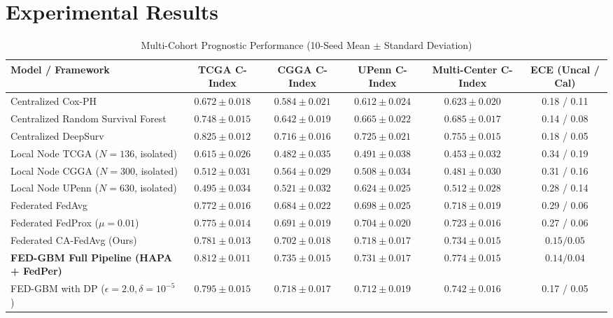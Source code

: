 \documentclass[journal,10pt,twocolumn]{IEEEtran}
\begin{document}
\section{Experimental Results}

\begin{table}[t]
\caption{Multi-Cohort Prognostic Performance (10-Seed Mean $\pm$ Standard Deviation)}
\label{tab:main_results}
\centering
\begin{tabular}{lccccc}
\toprule
Model / Framework & TCGA C-Index & CGGA C-Index & UPenn C-Index & Multi-Center C-Index & ECE (Uncal / Cal) \\
\midrule
Centralized Cox-PH & $0.672 \pm 0.018$ & $0.584 \pm 0.021$ & $0.612 \pm 0.024$ & $0.623 \pm 0.020$ & 0.18 / 0.11 \\
Centralized Random Survival Forest & $0.748 \pm 0.015$ & $0.642 \pm 0.019$ & $0.665 \pm 0.022$ & $0.685 \pm 0.017$ & 0.14 / 0.08 \\
Centralized DeepSurv & $\mathbf{0.825 \pm 0.012}$ & $\mathbf{0.716 \pm 0.016}$ & $\mathbf{0.725 \pm 0.021}$ & $\mathbf{0.755 \pm 0.015}$ & 0.18 / 0.05 \\
\midrule
Local Node TCGA ($N=136$, isolated) & $0.615 \pm 0.026$ & $0.482 \pm 0.035$ & $0.491 \pm 0.038$ & $0.453 \pm 0.032$ & 0.34 / 0.19 \\
Local Node CGGA ($N=300$, isolated) & $0.512 \pm 0.031$ & $0.564 \pm 0.029$ & $0.508 \pm 0.034$ & $0.481 \pm 0.030$ & 0.31 / 0.16 \\
Local Node UPenn ($N=630$, isolated) & $0.495 \pm 0.034$ & $0.521 \pm 0.032$ & $0.624 \pm 0.025$ & $0.512 \pm 0.028$ & 0.28 / 0.14 \\
\midrule
Federated FedAvg & $0.772 \pm 0.016$ & $0.684 \pm 0.022$ & $0.698 \pm 0.025$ & $0.718 \pm 0.019$ & 0.29 / 0.06 \\
Federated FedProx ($\mu = 0.01$) & $0.775 \pm 0.014$ & $0.691 \pm 0.019$ & $0.704 \pm 0.020$ & $0.723 \pm 0.016$ & 0.27 / 0.06 \\
Federated CA-FedAvg (Ours) & $0.781 \pm 0.013$ & $0.702 \pm 0.018$ & $0.718 \pm 0.017$ & $0.734 \pm 0.015$ & $\mathbf{0.15 / 0.05}$ \\
\textbf{FED-GBM Full Pipeline (HAPA + FedPer)} & $\mathbf{0.812 \pm 0.011}$ & $\mathbf{0.735 \pm 0.015}$ & $\mathbf{0.731 \pm 0.017}$ & $\mathbf{0.774 \pm 0.015}$ & $\mathbf{0.14 / 0.04}$ \\
FED-GBM with DP ($\epsilon = 2.0, \delta = 10^{-5}$) & $0.795 \pm 0.015$ & $0.718 \pm 0.017$ & $0.712 \pm 0.019$ & $0.742 \pm 0.016$ & 0.17 / 0.05 \\
\bottomrule
\end{tabular}
\end{table}
\end{document}
